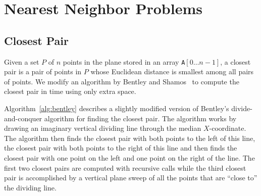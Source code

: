 
\section{Nearest Neighbor Problems}\label{sec:nn}

\subsection{Closest Pair}

Given a set $P$ of $n$ points in the plane stored in an array \texttt{A}$[0
\ldots n - 1]$, a closest pair is a pair of points in $P$ whose Euclidean
distance is smallest among all pairs of points. We modify an algorithm by
Bentley and Shamos~\cite{bentley:divide-and-conquer} to compute the closest
pair in  time using only  extra space.

Algorithm~\ref{alg:bentley} describes a slightly modified version of Bentley's
divide-and-conquer algorithm for finding the closest pair.  The algorithm
works by drawing an imaginary vertical dividing line through the median
$X$-coordinate.  The algorithm then finds the closest pair with both points to
the left of this line, the closest pair with both points to the right of this
line and then finds the closest pair with one point on the left and one point
on the right of the line.  The first two closest pairs are computed with
recursive calls while the third closest pair is accomplished by a vertical
plane sweep of all the points that are ``close to'' the dividing line.
 
